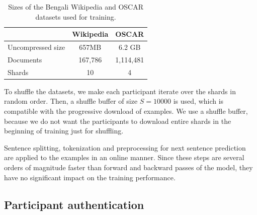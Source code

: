\begin{table}[h]
\vspace{-8pt}
\centering
\caption{Sizes of the Bengali Wikipedia and OSCAR datasets used for training.}
\label{tab:datasets_sizes}
\vspace{6pt}
\begin{tabular}{lcc}
\toprule
\textbf{}               & Wikipedia & OSCAR \\ \midrule
Uncompressed size & 657MB              & 6.2 GB         \\
Documents            & 167,786             & 1,114,481        \\
Shards               & 10                 & 4              \\ \bottomrule
\end{tabular}
\end{table}


To shuffle the datasets, we make each participant iterate over the shards in random order. Then, a shuffle buffer of size $S=10000$ is used, which is compatible with the progressive download of examples. We use a shuffle buffer, because we do not want the participants to download entire shards in the beginning of training just for shuffling.

Sentence splitting, tokenization and preprocessing for next sentence prediction are applied to the examples in an online manner. Since these steps are several orders of magnitude faster than forward and backward passes of the model, they have no significant impact on the training performance.

\subsection{Participant authentication}
\label{appendix:authorization}

